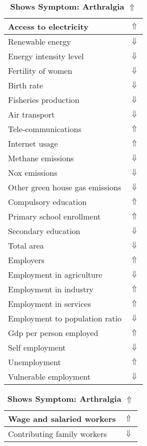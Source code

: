 \documentclass[12pt,notitlepage,oneside]{report}
\begin{document}
\begin{table}[!htb]
\caption{\textbf{Shows Symptom: Arthralgia $\Uparrow$}}
\centering
\label{Correlated Socio-economic Factors0}
\begin{tabular}{|l|l|}
\hline
Access to electricity & $\Uparrow$\\ \hline
Renewable energy & $\Downarrow$\\ \hline
Energy intensity level & $\Downarrow$\\ \hline
Fertility of women & $\Downarrow$\\ \hline
Birth rate & $\Downarrow$\\ \hline
Fisheries production & $\Downarrow$\\ \hline
Air transport  & $\Downarrow$\\ \hline
Tele-communications & $\Uparrow$\\ \hline
Internet usage & $\Uparrow$\\ \hline
Methane emissions & $\Downarrow$\\ \hline
Nox emissions & $\Downarrow$\\ \hline
Other green house gas emissions & $\Downarrow$\\ \hline
Compulsory education & $\Uparrow$\\ \hline
Primary school enrollment & $\Uparrow$\\ \hline
Secondary education & $\Downarrow$\\ \hline
Total area & $\Downarrow$\\ \hline
Employers & $\Uparrow$\\ \hline
Employment in agriculture & $\Downarrow$\\ \hline
Employment in industry & $\Uparrow$\\ \hline
Employment in services & $\Uparrow$\\ \hline
Employment to population ratio & $\Downarrow$\\ \hline
Gdp per person employed & $\Uparrow$\\ \hline
Self employment & $\Downarrow$\\ \hline
Unemployment & $\Uparrow$\\ \hline
Vulnerable employment & $\Downarrow$\\ \hline
\end{tabular}
\begin{tabular}{|l|l|}
\hline
Wage and salaried workers & $\Uparrow$\\ \hline
Contributing family workers & $\Downarrow$\\ \hline

\end{tabular}
\end{table}
\end{document}

